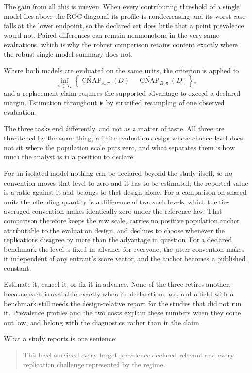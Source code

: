 \documentclass[11pt]{article}
\newcommand{\CNAP}{\operatorname{CNAP}}
\newcommand{\PSet}{\Pi_\star}
\newcommand{\CNAPta}{\widetilde{\CNAP}}
\theoremstyle{remark}
\begin{document}
The gain from all this is uneven. When every contributing threshold of a single model lies above the ROC diagonal its profile is nondecreasing and its worst case falls at the lower endpoint, so the declared set does little that a point prevalence would not. Paired differences can remain nonmonotone in the very same evaluations, which is why the robust comparison retains content exactly where the robust single-model summary does not.

Where both models are evaluated on the same units, the criterion is applied to
\[
\inf_{\pi\in\PSet}
\left\{
\CNAPta_{A,\pi}(D)-\CNAPta_{B,\pi}(D)
\right\},
\]
and a replacement claim requires the supported advantage to exceed a declared margin. Estimation throughout is by stratified resampling of one observed evaluation.

The three tasks end differently, and not as a matter of taste. All three are threatened by the same thing, a finite evaluation design whose chance level does not sit where the population scale puts zero, and what separates them is how much the analyst is in a position to declare.

For an isolated model nothing can be declared beyond the study itself, so no convention moves that level to zero and it has to be estimated; the reported value is a ratio against it and belongs to that design alone. For a comparison on shared units the offending quantity is a difference of two such levels, which the tie-averaged convention makes identically zero under the reference law. That comparison therefore keeps the raw scale, carries no positive population anchor attributable to the evaluation design, and declines to choose whenever the replications disagree by more than the advantage in question. For a declared benchmark the level is fixed in advance for everyone, the jitter convention makes it independent of any entrant's score vector, and the anchor becomes a published constant.

Estimate it, cancel it, or fix it in advance. None of the three retires another, because each is available exactly when its declarations are, and a field with a benchmark still needs the design-relative report for the studies that did not run it. Prevalence profiles and the two costs explain these numbers when they come out low, and belong with the diagnostics rather than in the claim.

What a study reports is one sentence:

\begin{quote}
This level survived every target prevalence declared relevant and every replication challenge represented by the regime.
\end{quote}
\end{document}

